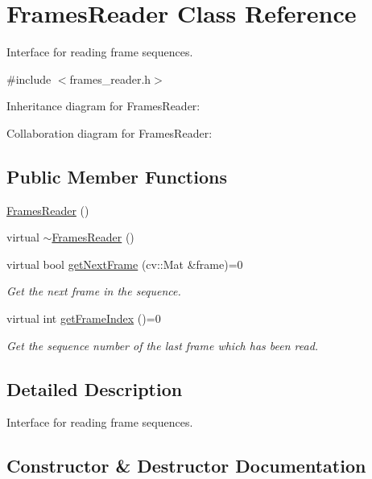 \hypertarget{classFramesReader}{}\section{Frames\+Reader Class Reference}
\label{classFramesReader}


Interface for reading frame sequences.  




{\ttfamily \#include $<$frames\+\_\+reader.\+h$>$}



Inheritance diagram for Frames\+Reader\+:


Collaboration diagram for Frames\+Reader\+:
\subsection*{Public Member Functions}
\begin{DoxyCompactItemize}
\item 
\hyperlink{classFramesReader_a58387168f406907d9c42aaae01a6f848}{Frames\+Reader} ()
\item 
virtual \hyperlink{classFramesReader_aae5a8e0eeb6a4a2f9470381727e04daf}{$\sim$\+Frames\+Reader} ()
\item 
virtual bool \hyperlink{classFramesReader_a031675760ddfb5594834586b6c297454}{get\+Next\+Frame} (cv\+::\+Mat \&frame)=0
\begin{DoxyCompactList}\small\item\em Get the next frame in the sequence. \end{DoxyCompactList}\item 
virtual int \hyperlink{classFramesReader_ad4cc333eb51477d4f527ce38c7efb523}{get\+Frame\+Index} ()=0
\begin{DoxyCompactList}\small\item\em Get the sequence number of the last frame which has been read. \end{DoxyCompactList}\end{DoxyCompactItemize}


\subsection{Detailed Description}
Interface for reading frame sequences. 

\subsection{Constructor \& Destructor Documentation}
\hypertarget{classFramesReader_a58387168f406907d9c42aaae01a6f848}{}
